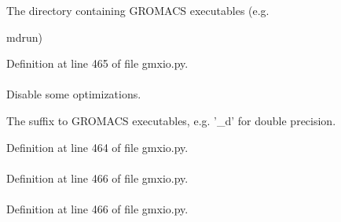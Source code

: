 \-The directory containing \-G\-R\-O\-M\-A\-C\-S executables (e.\-g. 

mdrun) 

\-Definition at line 465 of file gmxio.\-py.

\hypertarget{classforcebalance_1_1gmxio_1_1GMX_aa4a785e2fe56ab52dc7ba697f11ade38}{
\paragraph[{gmxsuffix}]{}}\label{classforcebalance_1_1gmxio_1_1GMX_aa4a785e2fe56ab52dc7ba697f11ade38}


\-Disable some optimizations. 

\-The suffix to \-G\-R\-O\-M\-A\-C\-S executables, e.\-g. '\-\_\-d' for double precision. 

\-Definition at line 464 of file gmxio.\-py.

\hypertarget{classforcebalance_1_1gmxio_1_1GMX_aff0a58dbc932d5721c034b6d94f0572f}{
\paragraph[{mdp}]{}}\label{classforcebalance_1_1gmxio_1_1GMX_aff0a58dbc932d5721c034b6d94f0572f}


\-Definition at line 466 of file gmxio.\-py.

\hypertarget{classforcebalance_1_1gmxio_1_1GMX_a8aa31cbeac385856edf0cbeeeae59138}{
\paragraph[{mol}]{}}\label{classforcebalance_1_1gmxio_1_1GMX_a8aa31cbeac385856edf0cbeeeae59138}


\-Definition at line 466 of file gmxio.\-py.

